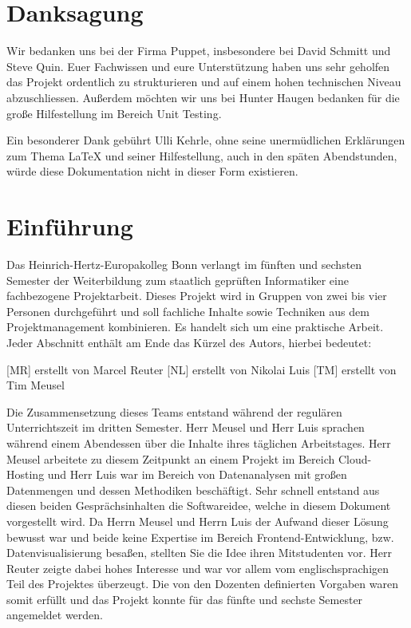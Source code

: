 \chapter*{Danksagung}
Wir bedanken uns bei der Firma Puppet, insbesondere bei David Schmitt und Steve
Quin. Euer Fachwissen und eure Unterstützung haben uns sehr geholfen das
Projekt ordentlich zu strukturieren und auf einem hohen technischen Niveau
abzuschliessen. Außerdem möchten wir uns bei Hunter Haugen bedanken für die
große Hilfestellung im Bereich Unit Testing.

Ein besonderer Dank gebührt Ulli Kehrle, ohne seine unermüdlichen Erklärungen
zum Thema \LaTeX{} und seiner Hilfestellung, auch in den späten Abendstunden,
würde diese Dokumentation nicht in dieser Form existieren.

\newpage

\tableofcontents
\listoffigures
\begingroup
\let\clearpage\relax
\lstlistoflistings{}
\listoftables
\endgroup

\chapter{Einführung}
\label{chap:einfuehrung}
Das Heinrich-Hertz-Europakolleg Bonn verlangt im fünften und sechsten Semester
der Weiterbildung zum staatlich geprüften Informatiker eine fachbezogene
Projektarbeit. Dieses Projekt wird in Gruppen von zwei bis vier Personen
durchgeführt und soll fachliche Inhalte sowie Techniken aus dem
Projektmanagement kombinieren. Es handelt sich um eine praktische Arbeit. Jeder
Abschnitt enthält am Ende das Kürzel des Autors, hierbei bedeutet:

\begin{outline}
  \1 {[MR]} erstellt von Marcel Reuter
  \1 {[NL]} erstellt von Nikolai Luis
  \1 {[TM]} erstellt von Tim Meusel
\end{outline}

Die Zusammensetzung dieses Teams entstand während der regulären Unterrichtszeit
im dritten Semester. Herr Meusel und Herr Luis sprachen während einem
Abendessen über die Inhalte ihres täglichen Arbeitstages. Herr Meusel arbeitete
zu diesem Zeitpunkt an einem Projekt im Bereich Cloud-Hosting und Herr Luis war
im Bereich von Datenanalysen mit großen Datenmengen und dessen Methodiken
beschäftigt. Sehr schnell entstand aus diesen beiden Gesprächsinhalten die
Softwareidee, welche in diesem Dokument vorgestellt wird. Da Herrn Meusel und
Herrn Luis der Aufwand dieser Lösung bewusst war und beide keine Expertise im
Bereich Frontend-Entwicklung, bzw. Datenvisualisierung besaßen, stellten Sie
die Idee ihren Mitstudenten vor. Herr Reuter zeigte dabei hohes Interesse und
war vor allem vom englischsprachigen Teil des Projektes überzeugt. Die von den
Dozenten definierten Vorgaben waren somit erfüllt und das Projekt konnte für
das fünfte und sechste Semester angemeldet werden.

